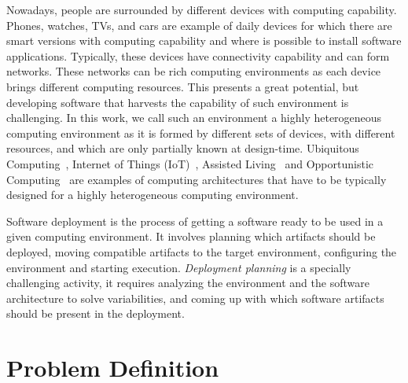 Nowadays, people are surrounded by different devices with computing capability. Phones, watches, TVs, and cars are example of daily devices for which there are smart versions with computing capability and where is possible to install software applications. Typically, these devices have connectivity capability and can form networks. These networks can be rich computing environments as each device brings different computing resources. This presents a great potential, but developing software that harvests the capability of such environment is challenging.
In this work, we call such an environment a highly heterogeneous computing environment as it is formed by different sets of devices, with different resources, and which are only partially known at design-time. Ubiquitous Computing~\cite{bell_yesterdays_2007}, Internet of Things (IoT)~\cite{atzori_internet_2010}, Assisted Living~\cite{kleinberger_ambient_2007} and Opportunistic Computing~\cite{smaldone_improving_2011} are examples of computing architectures that have to be typically designed for a highly heterogeneous computing environment.

Software deployment is the process of getting a software ready to be used in a given computing environment\cite{carzaniga_characterization_1998}. It involves planning which artifacts should be deployed, moving compatible artifacts to the target environment, configuring the environment and starting execution. \emph{Deployment planning} is a specially challenging activity, it requires analyzing the environment and the software architecture to solve variabilities, and coming up with which software artifacts should be present in the deployment.


\section{Problem Definition}


